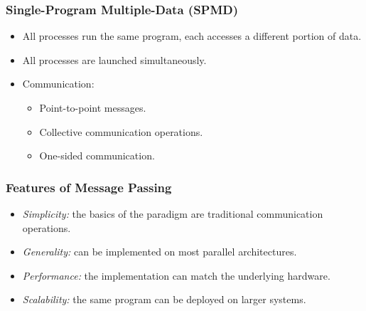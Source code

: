 \begin{frame}\frametitle{Single-Program Multiple-Data (SPMD)}

\vspace{5mm}
\begin{itemize}
\item {\Large All processes run the same program, each accesses a different portion of data.}
\vspace{3mm}
\item {\Large All processes are launched simultaneously.}
\vspace{3mm}
\item {\Large Communication:}
\begin{itemize}
\item {\large Point-to-point messages.}
\vspace{1mm}
\item {\large Collective communication operations.}
\vspace{1mm}
\item {\large One-sided communication. }
\end{itemize}
\end{itemize}

\end{frame}

\begin{frame}\frametitle{Features of Message Passing}

\vspace{5mm}
\begin{itemize}
\item {\Large \textit{Simplicity: } the basics of the paradigm are traditional communication operations.}
\vspace{5mm}
\item {\Large \textit{Generality:} can be implemented on most parallel architectures.}
\vspace{5mm}
\item {\Large \textit{Performance:} the implementation can match the underlying hardware.}
\vspace{5mm}
\item {\Large \textit{Scalability:} the same program can be deployed on larger systems.}
\end{itemize}

\end{frame}



